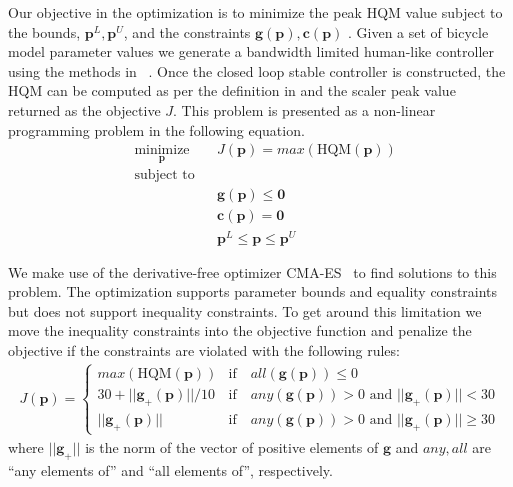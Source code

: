 \documentclass{bmd2019p}
\begin{document}
Our objective in the optimization is to minimize the peak HQM value subject to
the bounds, $\mathbf{p}^L,\mathbf{p}^U$, and the constraints
$\mathbf{g}(\mathbf{p}),\mathbf{c}(\mathbf{p})$ . Given a set of bicycle model
parameter values we generate a bandwidth limited human-like controller using
the methods in ~\cite{Moore2012}. Once the closed loop stable controller is
constructed, the HQM can be computed as per the definition in \cite{Hess2012}
and the scaler peak value returned as the objective $J$. This problem is
presented as a non-linear programming problem in the following equation.
%
\begin{equation}
  \begin{aligned}
    & \underset{\mathbf{p}}{\text{minimize}} & & J(\mathbf{p})=max(\textrm{HQM}(\mathbf{p})) \\
    & \text{subject to} & & \\
    & & & \mathbf{g}(\mathbf{p}) \leq \mathbf{0} \\
    & & & \mathbf{c}(\mathbf{p}) = \mathbf{0} \\
    & & & \mathbf{p}^L \leq \mathbf{p} \leq \mathbf{p}^U
  \end{aligned}
\end{equation}

We make use of the derivative-free optimizer CMA-ES~\cite{Hansen1996} to find
solutions to this problem. The optimization supports parameter bounds and
equality constraints but does not support inequality constraints. To get around
this limitation we move the inequality constraints into the objective function
and penalize the objective if the constraints are violated with the following
rules:
%
\begin{align}
  J(\mathbf{p}) =
  \begin{cases}
    max(\textrm{HQM}(\mathbf{p})) & \textrm{if} \quad all(\mathbf{g}(\mathbf{p})) \leq 0 \\
    30 + ||\mathbf{g}_{+}(\mathbf{p})||/10 & \textrm{if} \quad
      any(\mathbf{g}(\mathbf{p})) > 0 \textrm{ and } ||\mathbf{g}_{+}(\mathbf{p})|| < 30 \\
    ||\mathbf{g}_{+}(\mathbf{p})|| & \textrm{if} \quad
      any(\mathbf{g}(\mathbf{p})) > 0 \textrm{ and } ||\mathbf{g}_{+}(\mathbf{p})|| \geq 30
  \end{cases}
\end{align}
where $||\mathbf{g}_{+}||$ is the norm of the vector of positive elements of
$\mathbf{g}$ and $any,all$ are ``any elements of'' and ``all elements of'',
respectively.
\end{document}
